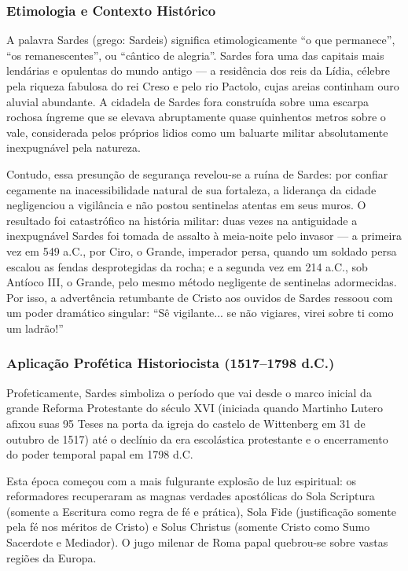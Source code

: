 \subsubsection*{Etimologia e Contexto Histórico}
A palavra Sardes (grego: Sardeis) significa etimologicamente ``o que permanece'', ``os remanescentes'', ou ``cântico de alegria''. Sardes fora uma das capitais mais lendárias e opulentas do mundo antigo — a residência dos reis da Lídia, célebre pela riqueza fabulosa do rei Creso e pelo rio Pactolo, cujas areias continham ouro aluvial abundante. A cidadela de Sardes fora construída sobre uma escarpa rochosa íngreme que se elevava abruptamente quase quinhentos metros sobre o vale, considerada pelos próprios lidios como um baluarte militar absolutamente inexpugnável pela natureza.

Contudo, essa presunção de segurança revelou-se a ruína de Sardes: por confiar cegamente na inacessibilidade natural de sua fortaleza, a liderança da cidade negligenciou a vigilância e não postou sentinelas atentas em seus muros. O resultado foi catastrófico na história militar: duas vezes na antiguidade a inexpugnável Sardes foi tomada de assalto à meia-noite pelo invasor — a primeira vez em 549 a.C., por Ciro, o Grande, imperador persa, quando um soldado persa escalou as fendas desprotegidas da rocha; e a segunda vez em 214 a.C., sob Antíoco III, o Grande, pelo mesmo método negligente de sentinelas adormecidas. Por isso, a advertência retumbante de Cristo aos ouvidos de Sardes ressoou com um poder dramático singular: ``Sê vigilante... se não vigiares, virei sobre ti como um ladrão!''


\subsubsection*{Aplicação Profética Historiocista (1517–1798 d.C.)}
Profeticamente, Sardes simboliza o período que vai desde o marco inicial da grande Reforma Protestante do século XVI (iniciada quando Martinho Lutero afixou suas 95 Teses na porta da igreja do castelo de Wittenberg em 31 de outubro de 1517) até o declínio da era escolástica protestante e o encerramento do poder temporal papal em 1798 d.C.

Esta época começou com a mais fulgurante explosão de luz espiritual: os reformadores recuperaram as magnas verdades apostólicas do Sola Scriptura (somente a Escritura como regra de fé e prática), Sola Fide (justificação somente pela fé nos méritos de Cristo) e Solus Christus (somente Cristo como Sumo Sacerdote e Mediador). O jugo milenar de Roma papal quebrou-se sobre vastas regiões da Europa.


